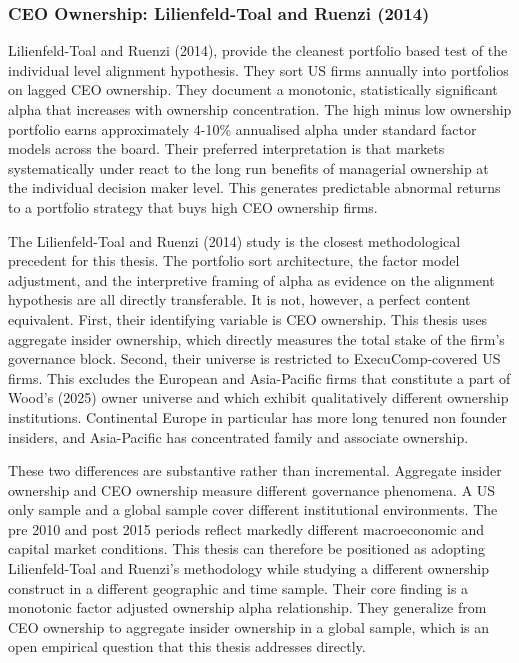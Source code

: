 \subsubsection{CEO Ownership: Lilienfeld-Toal and Ruenzi (2014)}

Lilienfeld-Toal and Ruenzi (2014), provide the cleanest portfolio based test of the individual level alignment hypothesis. They sort US firms annually into portfolios on lagged CEO ownership. They document a monotonic, statistically significant alpha that increases with ownership concentration. The high minus low ownership portfolio earns approximately 4-10\% annualised alpha under standard factor models across the board. Their preferred interpretation is that markets systematically under react to the long run benefits of managerial ownership at the individual decision maker level. This generates predictable abnormal returns to a portfolio strategy that buys high CEO ownership firms.

The Lilienfeld-Toal and Ruenzi (2014) study is the closest methodological precedent for this thesis. The portfolio sort architecture, the factor model adjustment, and the interpretive framing of alpha as evidence on the alignment hypothesis are all directly transferable. It is not, however, a perfect content equivalent. First, their identifying variable is CEO ownership. This thesis uses aggregate insider ownership, which directly measures the total stake of the firm's governance block. Second, their universe is restricted to ExecuComp-covered US firms. This excludes the European and Asia-Pacific firms that constitute a part of Wood's (2025) owner universe and which exhibit qualitatively different ownership institutions. Continental Europe in particular has more long tenured non founder insiders, and Asia-Pacific has concentrated family and associate ownership. 

These two differences are substantive rather than incremental. Aggregate insider ownership and CEO ownership measure different governance phenomena. A US only sample and a global sample cover different institutional environments. The pre 2010 and post 2015 periods reflect markedly different macroeconomic and capital market conditions. This thesis can therefore be positioned as adopting Lilienfeld-Toal and Ruenzi's methodology while studying a different ownership construct in a different geographic and time sample. Their core finding is a monotonic factor adjusted ownership alpha relationship. They generalize from CEO ownership to aggregate insider ownership in a global sample, which is an open empirical question that this thesis addresses directly.


